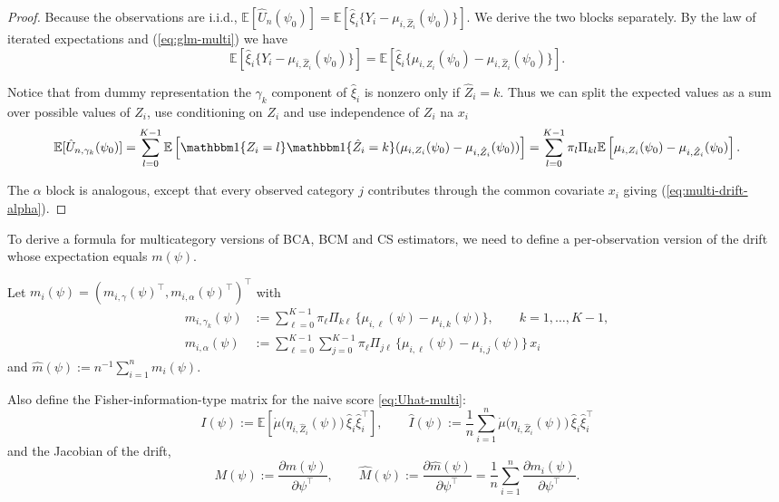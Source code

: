 \documentclass[11pt]{article}
\theoremstyle{definition}
\theoremstyle{remark}
\newcommand{\E}{\mathbb{E}}
\begin{document}
\begin{proof}
Because the observations are i.i.d., $\E[\hat U_n(\psi_0)]=\E[\hat\xi_i\{Y_i-\mu_{i,\hat Z_i}(\psi_0)\}]$.
We derive the two blocks separately.
By the law of iterated expectations and (\ref{eq:glm-multi}) we have
\begin{equation}
\E\!\left[\hat\xi_i\{Y_i-\mu_{i,\hat Z_i}(\psi_0)\}\right]
=
\E\!\left[\hat\xi_i\{\mu_{i,Z_i}(\psi_0)-\mu_{i,\hat Z_i}(\psi_0)\}\right].
\label{eq:multi-step1}
\end{equation}

Notice that from dummy representation the $\gamma_k$ component of $\hat\xi_i$ is nonzero only if $\hat Z_i = k$. Thus we can split the expected values as a sum over possible values of $Z_i$, use conditioning on $Z_i$ and use independence of $Z_i$ na $x_i$
\[ \E [\hat U_{n, \gamma_k}(\psi_0)] = \sum_{l=0}^{K-1}\E \left[ \mathbbm 1\{ Z_i=l \}\mathbbm 1 \{\hat Z_i = k \}(\mu_{i,Z_i}(\psi_0)-\mu_{i,\hat Z_i}(\psi_0)) \right] = \sum_{l=0}^{K-1}\pi_l\Pi_{kl}\E \left[ \mu_{i,Z_i}(\psi_0)-\mu_{i,\hat Z_i}(\psi_0) \right]. \]

The $\alpha$ block is analogous, except that every observed category $j$ contributes  through the common covariate $x_i$ giving (\ref{eq:multi-drift-alpha}).
\end{proof}

To derive a formula for multicategory versions of BCA, BCM and CS estimators, we need to define a per-observation version of the drift whose expectation equals $m(\psi)$.

Let $m_i(\psi)=(m_{i,\gamma}(\psi)^\top,m_{i,\alpha}(\psi)^\top)^\top$ with
\begin{align}
m_{i,\gamma_k}(\psi)
&:=\sum_{\ell=0}^{K-1}\pi_\ell \Pi_{k\ell}\,\Big\{\mu_{i,\ell}(\psi)-\mu_{i,k}(\psi)\Big\},
\qquad k=1,\dots,K-1,\label{eq:mi-multi-gamma}\\[3pt]
m_{i,\alpha}(\psi)
&:=\sum_{\ell=0}^{K-1}\sum_{j=0}^{K-1}\pi_\ell \Pi_{j\ell}\,
\Big\{\mu_{i,\ell}(\psi)-\mu_{i,j}(\psi)\Big\}\,x_i
\label{eq:mi-multi-alpha}
\end{align}
and $\hat m(\psi):=n^{-1}\sum_{i=1}^n m_i(\psi)$.

Also define the Fisher-information-type matrix for the naive score \eqref{eq:Uhat-multi}:
\begin{equation}
I(\psi):=\E\!\left[\dot\mu\big(\eta_{i,\hat Z_i}(\psi)\big)\,\hat\xi_i\hat\xi_i^\top\right],
\qquad
\hat I(\psi):=\frac{1}{n}\sum_{i=1}^n \dot\mu\big(\eta_{i,\hat Z_i}(\psi)\big)\,\hat\xi_i\hat\xi_i^\top
\label{eq:I-multi}
\end{equation}
and the Jacobian of the drift,
\[
M(\psi):=\frac{\partial m(\psi)}{\partial\psi^\top},
\qquad
\hat M(\psi):=\frac{\partial \hat m(\psi)}{\partial\psi^\top}
=\frac{1}{n}\sum_{i=1}^n\frac{\partial m_i(\psi)}{\partial\psi^\top}.
\]
\end{document}
